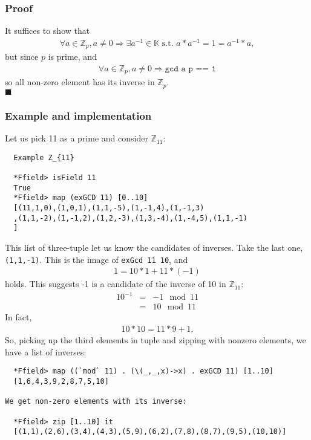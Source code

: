 \documentclass[11pt]{book}
\begin{document}
\subsubsection{Proof}
It suffices to show that 
\begin{eqnarray}
\forall a \in \mathbb{Z}_p, a \neq 0 \Rightarrow \exists a^{-1} \in \mathbb{K} \text{ s.t. } a*a^{-1} = 1 = a^{-1}*a,
\end{eqnarray}
but since $p$ is prime, and
\begin{eqnarray}
\forall a \in \mathbb{Z}_p, a \neq 0 \Rightarrow \texttt{gcd a p == 1}
\end{eqnarray}
so all non-zero element has its inverse in $ \mathbb{Z}_p$.\\
$\blacksquare$

\subsubsection{Example and implementation}
\label{inverses}
Let us pick 11 as a prime and consider $\mathbb{Z}_{11}$:
\begin{verbatim}
  Example Z_{11}

  *Ffield> isField 11
  True
  *Ffield> map (exGCD 11) [0..10]
  [(11,1,0),(1,0,1),(1,1,-5),(1,-1,4),(1,-1,3)
  ,(1,1,-2),(1,-1,2),(1,2,-3),(1,3,-4),(1,-4,5),(1,1,-1)
  ]
\end{verbatim}
This list of three-tuple let us know the candidates of inverses.
Take the last one, \verb+(1,1,-1)+.
This is the image of \verb+exGcd 11 10+, and 
\begin{eqnarray}
1 = 10*1 + 11*(-1)
\end{eqnarray}
holds.
This suggests -1 is a candidate of the inverse of 10 in $\mathbb{Z}_{11}$:
\begin{eqnarray}
10^{-1} &=& -1 \mod 11 \\
&=& 10 \mod 11
\end{eqnarray}
In fact,
\begin{eqnarray}
10*10 = 11*9+1.
\end{eqnarray}
So, picking up the third elements in tuple and zipping with nonzero elements, we have a list of inverses:
\begin{verbatim}
  *Ffield> map ((`mod` 11) . (\(_,_,x)->x) . exGCD 11) [1..10] 
  [1,6,4,3,9,2,8,7,5,10]

We get non-zero elements with its inverse:

  *Ffield> zip [1..10] it
  [(1,1),(2,6),(3,4),(4,3),(5,9),(6,2),(7,8),(8,7),(9,5),(10,10)]
\end{verbatim}
\end{document}
